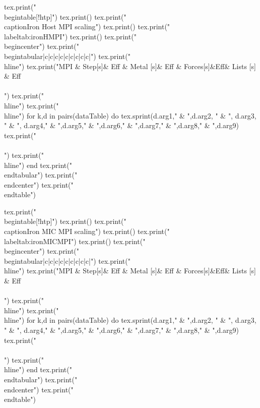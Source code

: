 %
\begin{luacode*}
  tex.print("\\begin{table}[!htp]")
  tex.print()
  tex.print("\\caption{Iron Host MPI scaling}")
  tex.print()
  tex.print("\\label{tab:ironHMPI}")
  tex.print()
  tex.print("\\begin{center}")
  tex.print("\\begin{tabular}{|c|c|c|c|c|c|c|c|c|}")
  tex.print("\\hline")
  tex.print("MPI & Step[s]& Eff & Metal [s]& Eff & Forces[s]&Eff& Lists [s] & Eff\\\\")
  tex.print("\\hline")
  tex.print("\\hline")
  for k,d in pairs(dataTable) do
    tex.sprint(d.arg1," & ",d.arg2, " & ", d.arg3, " & ", d.arg4," & ",d.arg5," & ",d.arg6," & ",d.arg7," & ",d.arg8," & ",d.arg9)
    tex.print(" \\\\")
    tex.print("\\hline")
  end
  tex.print("\\end{tabular}")
  tex.print("\\end{center}")
  tex.print("\\end{table}")
\end{luacode*}
%
\begin{luacode*}
  tex.print("\\begin{table}[!htp]")
  tex.print()
  tex.print("\\caption{Iron MIC MPI scaling}")
  tex.print()
  tex.print("\\label{tab:ironMICMPI}")
  tex.print()
  tex.print("\\begin{center}")
  tex.print("\\begin{tabular}{|c|c|c|c|c|c|c|c|c|}")
  tex.print("\\hline")
  tex.print("MPI & Step[s]& Eff & Metal [s]& Eff & Forces[s]&Eff& Lists [s] & Eff\\\\")
  tex.print("\\hline")
  tex.print("\\hline")
  for k,d in pairs(dataTable) do
    tex.sprint(d.arg1," & ",d.arg2, " & ", d.arg3, " & ", d.arg4," & ",d.arg5," & ",d.arg6," & ",d.arg7," & ",d.arg8," & ",d.arg9)
    tex.print(" \\\\")
    tex.print("\\hline")
  end
  tex.print("\\end{tabular}")
  tex.print("\\end{center}")
  tex.print("\\end{table}")
\end{luacode*}
